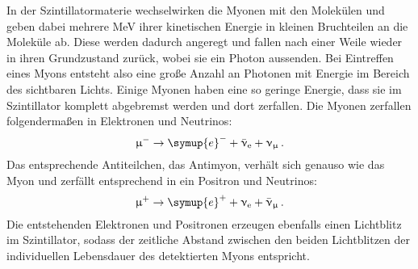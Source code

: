 In der Szintillatormaterie wechselwirken die Myonen mit den Molekülen und geben dabei mehrere MeV ihrer kinetischen Energie in kleinen
Bruchteilen an die Moleküle ab. Diese werden dadurch angeregt und fallen nach einer Weile wieder in ihren Grundzustand zurück, wobei
sie ein Photon aussenden. Bei Eintreffen eines Myons entsteht also eine große Anzahl an Photonen mit Energie im Bereich des sichtbaren
Lichts. Einige Myonen haben eine so geringe Energie, dass sie im Szintillator komplett abgebremst werden und dort
zerfallen. Die Myonen zerfallen folgendermaßen in Elektronen und Neutrinos:
\begin{equation*}
  \upmu^- \to \symup{e}^- + \bar{\upnu}_\text{e} + \upnu_{\upmu} \,.
\end{equation*}
Das entsprechende Antiteilchen, das Antimyon, verhält sich genauso wie das Myon und zerfällt entsprechend in ein Positron und Neutrinos:
\begin{equation*}
  \upmu^+ \to \symup{e}^+ + \upnu_\text{e} + \bar{\upnu}_{\upmu} \,.
\end{equation*}
Die entstehenden Elektronen und Positronen erzeugen ebenfalls einen Lichtblitz im Szintillator, sodass der zeitliche Abstand zwischen
den beiden Lichtblitzen der individuellen Lebensdauer des detektierten Myons entspricht.

